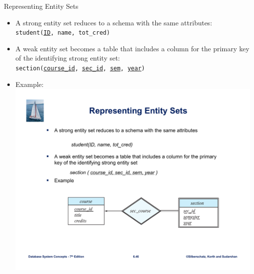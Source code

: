 \documentclass{beamer}
\begin{document}
\begin{frame}{Representing Entity Sets}
    \begin{itemize}
        \item A strong entity set reduces to a schema with the same attributes: \\
        \texttt{student(\underline{ID}, name, tot\_cred)}
        \item A weak entity set becomes a table that includes a column for the primary key of the identifying strong entity set: \\
        \texttt{section(\underline{course\_id}, \underline{sec\_id}, \underline{sem}, \underline{year})}
        \item Example:
        \includegraphics[width=\textwidth, clip,trim=0cm 5cm 0cm 12cm]{figures/weak_entities.pdf}
    \end{itemize}
\end{frame}
\end{document}
